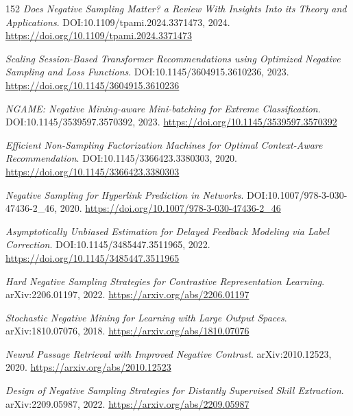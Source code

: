\documentclass[11pt,a4paper]{article}
\begin{document}
\begin{thebibliography}{152}
\newblock \emph{Does Negative Sampling Matter? a Review With Insights Into its Theory and Applications}.
\newblock DOI:10.1109/tpami.2024.3371473, 2024.
\newblock \url{https://doi.org/10.1109/tpami.2024.3371473}

\newblock \emph{Scaling Session-Based Transformer Recommendations using Optimized Negative Sampling and Loss Functions}.
\newblock DOI:10.1145/3604915.3610236, 2023.
\newblock \url{https://doi.org/10.1145/3604915.3610236}

\newblock \emph{NGAME: Negative Mining-aware Mini-batching for Extreme Classification}.
\newblock DOI:10.1145/3539597.3570392, 2023.
\newblock \url{https://doi.org/10.1145/3539597.3570392}

\newblock \emph{Efficient Non-Sampling Factorization Machines for Optimal Context-Aware Recommendation}.
\newblock DOI:10.1145/3366423.3380303, 2020.
\newblock \url{https://doi.org/10.1145/3366423.3380303}

\newblock \emph{Negative Sampling for Hyperlink Prediction in Networks}.
\newblock DOI:10.1007/978-3-030-47436-2\_46, 2020.
\newblock \url{https://doi.org/10.1007/978-3-030-47436-2_46}

\newblock \emph{Asymptotically Unbiased Estimation for Delayed Feedback Modeling via Label Correction}.
\newblock DOI:10.1145/3485447.3511965, 2022.
\newblock \url{https://doi.org/10.1145/3485447.3511965}

\newblock \emph{Hard Negative Sampling Strategies for Contrastive Representation Learning}.
\newblock arXiv:2206.01197, 2022.
\newblock \url{https://arxiv.org/abs/2206.01197}

\newblock \emph{Stochastic Negative Mining for Learning with Large Output Spaces}.
\newblock arXiv:1810.07076, 2018.
\newblock \url{https://arxiv.org/abs/1810.07076}

\newblock \emph{Neural Passage Retrieval with Improved Negative Contrast}.
\newblock arXiv:2010.12523, 2020.
\newblock \url{https://arxiv.org/abs/2010.12523}

\newblock \emph{Design of Negative Sampling Strategies for Distantly Supervised Skill Extraction}.
\newblock arXiv:2209.05987, 2022.
\newblock \url{https://arxiv.org/abs/2209.05987}


\end{thebibliography}
\end{document}
